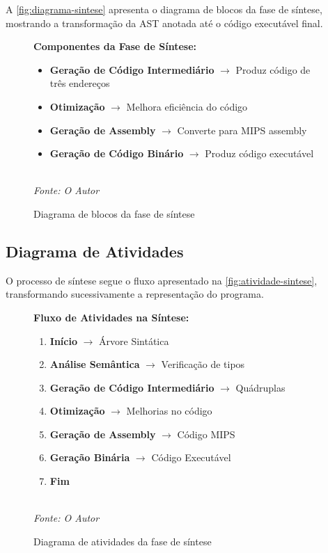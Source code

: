 \documentclass[
	12pt,				%
	oneside,
	a4paper,			%
	english,			%
	french,				%
	spanish,			%
	brazil,				%
	]{abntex2}
\begin{document}
A \autoref{fig:diagrama-sintese} apresenta o diagrama de blocos da fase de síntese, mostrando a transformação da AST anotada até o código executável final.

\begin{figure}[H]
\centering
\caption{Diagrama de blocos da fase de síntese}
\label{fig:diagrama-sintese}
\begin{minipage}{0.8\textwidth}
\textbf{Componentes da Fase de Síntese:}
\begin{itemize}
    \item \textbf{Geração de Código Intermediário} $\rightarrow$ Produz código de três endereços
    \item \textbf{Otimização} $\rightarrow$ Melhora eficiência do código
    \item \textbf{Geração de Assembly} $\rightarrow$ Converte para MIPS assembly
    \item \textbf{Geração de Código Binário} $\rightarrow$ Produz código executável
\end{itemize}
\end{minipage}
\\
\textit{Fonte: O Autor}
\end{figure}

\subsection{Diagrama de Atividades}

O processo de síntese segue o fluxo apresentado na \autoref{fig:atividade-sintese}, transformando sucessivamente a representação do programa.

\begin{figure}[H]
\centering
\caption{Diagrama de atividades da fase de síntese}
\label{fig:atividade-sintese}
\begin{minipage}{0.7\textwidth}
\textbf{Fluxo de Atividades na Síntese:}
\begin{enumerate}
    \item \textbf{Início} $\rightarrow$ Árvore Sintática
    \item \textbf{Análise Semântica} $\rightarrow$ Verificação de tipos
    \item \textbf{Geração de Código Intermediário} $\rightarrow$ Quádruplas
    \item \textbf{Otimização} $\rightarrow$ Melhorias no código
    \item \textbf{Geração de Assembly} $\rightarrow$ Código MIPS
    \item \textbf{Geração Binária} $\rightarrow$ Código Executável
    \item \textbf{Fim}
\end{enumerate}
\end{minipage}
\\
\textit{Fonte: O Autor}
\end{figure}
\end{document}
